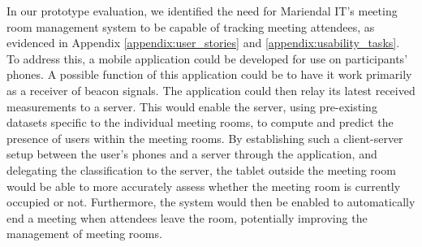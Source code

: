 In our prototype evaluation, we identified the need for Mariendal IT's meeting room management system to be capable of tracking meeting attendees, as evidenced in Appendix \ref{appendix:user_stories} and \ref{appendix:usability_tasks}. 
To address this, a mobile application could be developed for use on participants' phones.
A possible function of this application could be to have it work primarily as a receiver of beacon signals.
The application could then relay its latest received measurements to a server. 
This would enable the server, using pre-existing datasets specific to the individual meeting rooms, to compute and predict the presence of users within the meeting rooms. 
By establishing such a client-server setup between the user's phones and a server through the application, and delegating the classification to the server, the tablet outside the meeting room would be able to more accurately assess whether the meeting room is currently occupied or not.
Furthermore, the system would then be enabled to automatically end a meeting when attendees leave the room, potentially improving the management of meeting rooms.

